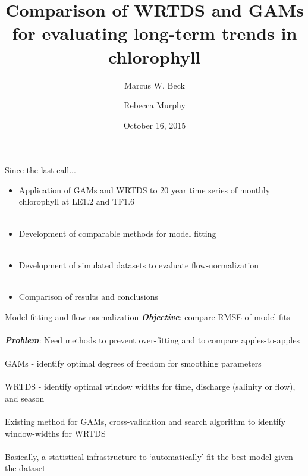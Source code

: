 \documentclass[serif]{beamer}\usepackage[]{graphicx}\usepackage[]{color}
\newcommand{\Bigtxt}[1]{\textbf{\textit{#1}}}
\begin{document}
\title[Comparison of WRTDS and GAMs]{Comparison of WRTDS and GAMs for evaluating long-term trends in chlorophyll}

\author[Beck, Murphy]{Marcus W. Beck \and Rebecca Murphy}

\date{October 16, 2015}


\begin{frame}
\titlepage
\end{frame}

\begin{frame}{Since the last call...}
\begin{itemize}
\item Application of GAMs and WRTDS to 20 year time series of monthly chlorophyll at LE1.2 and TF1.6 \\~\\
\item Development of comparable methods for model fitting \\~\\
\item Development of simulated datasets to evaluate flow-normalization \\~\\
\item Comparison of results and conclusions
\end{itemize}
\end{frame}

\begin{frame}{Model fitting and flow-normalization}
\Bigtxt{Objective}: compare RMSE of model fits \\~\\
\Bigtxt{Problem}: Need methods to prevent over-fitting and to compare apples-to-apples\\~\\
GAMs - identify optimal degrees of freedom for smoothing parameters \\~\\
WRTDS - identify optimal window widths for time, discharge (salinity or flow), and season \\~\\
Existing method for GAMs, cross-validation and search algorithm to identify window-widths for WRTDS \\~\\
Basically, a statistical infrastructure to `automatically' fit the best model given the dataset \\~\\
\end{frame}
\end{document}

